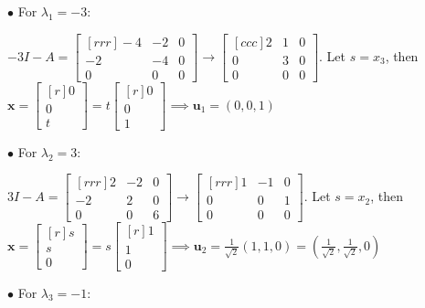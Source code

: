 \documentclass{article}
\newcommand\ddfrac[2]{\frac{\displaystyle #1}{\displaystyle #2}}
\begin{document}
    $\bullet$ For $\lambda _1 = -3$:

    $-3I - A = \begin{bmatrix}[rrr]
        -4 & -2 & 0 \\
        -2 & -4 & 0 \\
        0 & 0 & 0 
    \end{bmatrix} \to \begin{bmatrix}[ccc]
        2 & 1 & 0 \\
        0 & 3 & 0 \\
        0 & 0 & 0 
    \end{bmatrix} $. Let $s = x_3$, then $ \textbf{x} = \begin{bmatrix}[r]
        0 \\ 0 \\ t 
    \end{bmatrix} = t \begin{bmatrix}[r]
        0 \\ 0 \\ 1 
    \end{bmatrix} $$ \implies \textbf{u}_1 = (0,0,1)$

    $\bullet$ For $ \lambda_2 = 3$: 
   
    $3I - A = \begin{bmatrix}[rrr]
        2 & -2 & 0 \\
        -2 & 2 & 0 \\
        0 & 0 & 6 
    \end{bmatrix} \to \begin{bmatrix}[rrr]
        1 & -1 & 0 \\
        0 & 0 & 1 \\
        0 & 0 & 0 
    \end{bmatrix} $. Let $s = x_2$, then $ \textbf{x} = \begin{bmatrix}[r]
        s \\
        s \\
        0 
    \end{bmatrix}  = s \begin{bmatrix}[r]
        1 \\ 
        1 \\
        0 
    \end{bmatrix}  \implies \textbf{u}_2 = \ddfrac{1}{\sqrt{2}} (1,1,0) = \left( \ddfrac{1}{\sqrt{2}} , 
    \ddfrac{1}{\sqrt{2}} , 0\right) $

    $\bullet$ For $ \lambda _3 = -1$:
\end{document}
